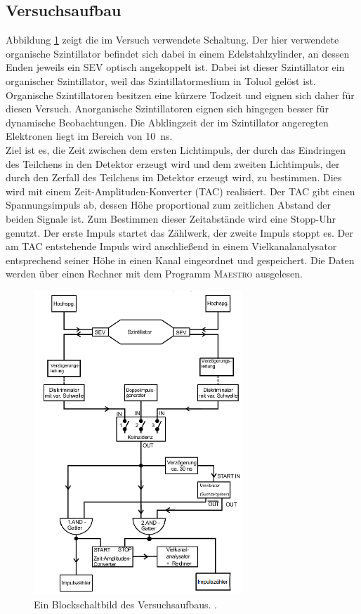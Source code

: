 \documentclass[
  bibliography=totoc,     %
  captions=tableheading,  %
  titlepage=firstiscover, %
]{scrartcl}
\begin{document}
  \subsection{Versuchsaufbau}
  \label{sec:Aufbau}
  	Abbildung \ref{fig:aufbau} zeigt die im Versuch verwendete Schaltung.
  	Der hier verwendete organische Szintillator befindet sich dabei in einem
    Edelstahlzylinder, an dessen Enden jeweils ein SEV optisch angekoppelt ist.
    Dabei ist dieser Szintillator ein organischer Szintillator, weil das
    Szintillatormedium in Toluol gelöst ist. Organische Szintillatoren besitzen
    eine kürzere Todzeit und eignen sich daher für diesen Versuch. Anorganische
    Szintillatoren eignen sich hingegen besser für dynamische Beobachtungen.
    Die Abklingzeit der im Szintillator angeregten Elektronen liegt im Bereich
    von \SI{10}{\nano\second}.\\
  	Ziel ist es, die Zeit zwischen dem ersten Lichtimpuls, der durch das
    Eindringen des Teilchens in den Detektor erzeugt wird und dem zweiten
    Lichtimpuls, der durch den Zerfall des Teilchens im Detektor erzeugt wird,
    zu bestimmen. Dies wird mit einem Zeit-Amplituden-Konverter (TAC) realisiert.
    Der TAC gibt einen Spannungsimpuls ab, dessen Höhe proportional zum zeitlichen Abstand der
  	beiden Signale ist. Zum Bestimmen dieser Zeitabstände wird eine Stopp-Uhr genutzt.
    Der erste Impuls startet das Zählwerk, der zweite Impuls stoppt es.
    Der am TAC entstehende Impuls wird anschließend in einem Vielkanalanalysator
  	entsprechend seiner Höhe in einen Kanal eingeordnet und gespeichert.
  	Die Daten werden über einen Rechner mit dem Programm \textsc{Maestro} ausgelesen.
    \newpage
  	\begin{figure}[H]
    	\centering
    	\includegraphics[width=0.7\textwidth]{Bilder/AufbauB.png}
    	\caption{Ein Blockschaltbild des Versuchsaufbaus. \cite{anleitung}.}
    	\label{fig:aufbau}
  	\end{figure}
\end{document}
